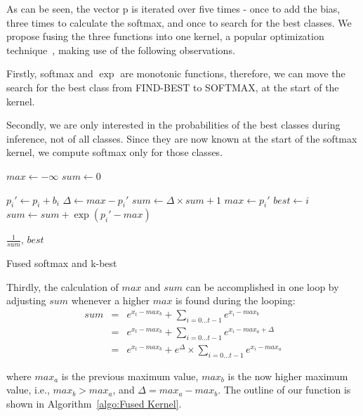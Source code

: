 \documentclass[11pt,a4paper]{article}
\begin{document}
As can be seen, the vector p is iterated over five times - once to add the bias, three times to calculate the softmax, and once to search for the best classes. We propose fusing the three functions into one kernel, a popular optimization technique~\citep{Guevara2009EnablingTP}, making use of the following observations.

Firstly, softmax and $\exp$ are monotonic functions, therefore, we can move the search for the best class from FIND-BEST to SOFTMAX, at the start of the kernel.

Secondly, we are only interested in the probabilities of the best classes during inference, not of all classes. Since they are now known at the start of the softmax kernel, we compute softmax only for those classes.

\begin{algorithm}
\begin{algorithmic}


\State $max \gets - \infty$ 
\State $sum \gets 0$ 

  \State $p_i' \gets p_i + b_i$  
    \State $\Delta \gets max - p_i'$
    \State $sum \gets \Delta \times sum + 1 $
    \State $max \gets p_i'$
    \State $best \gets i$
  \Else
    \State $sum \gets sum + \exp(p_i' - max)$
  \EndIf
\EndFor

\Return $\frac{1}{sum}$, $best$ 

\EndProcedure
\end{algorithmic}

\caption{Fused softmax and k-best}
\label{algo:Fused Kernel}
\end{algorithm}

Thirdly, the calculation of $max$ and $sum$ can be accomplished in one loop by adjusting $sum$ whenever a higher $max$ is found during the looping:
\begin{eqnarray*}
sum & = & e^{x_t - max_b} + \sum_{i=0...t-1}{e^{x_i - max_b}} \\
    & = & e^{x_t - max_b} + \sum_{i=0...t-1}{e^{x_i - max_a + \Delta}}  \\
    & = & e^{x_t - max_b} + e^{\Delta} \times \sum_{i=0...t-1}{e^{x_i - max_a}} 
\end{eqnarray*}

where $max_a$ is the previous maximum value, $max_b$ is the now higher maximum value, i.e., $max_b > max_a$, and $\Delta = max_a - max_b$. The outline of our function is shown in Algorithm~\ref{algo:Fused Kernel}.
\end{document}
